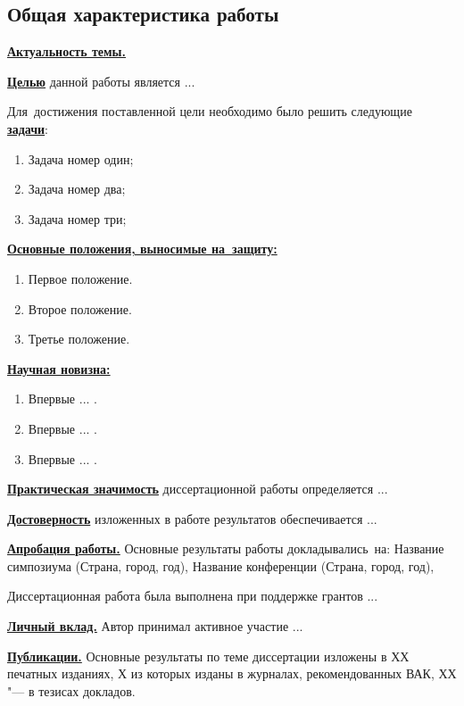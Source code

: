 \subsection*{\Large Общая характеристика работы}
\fontsize{14pt}{15pt}\selectfont
\underline{\textbf{Актуальность темы.}}

\underline{\textbf{Целью}} данной работы является ...

Для~достижения поставленной цели необходимо было решить следующие \underline{\textbf{задачи}}:
\begin{enumerate}
 \item Задача номер один;
 \item Задача номер два;
 \item Задача номер три;
\end{enumerate}

\underline{\textbf{Основные положения, выносимые на~защиту:}}
\begin{enumerate}
 \item Первое положение.
 \item Второе положение.
 \item Третье положение.
\end{enumerate}

\underline{\textbf{Научная новизна:}}
\begin{enumerate}
 \item Впервые ... . 
 \item Впервые ... .
 \item Впервые ... . 
\end{enumerate}

\underline{\textbf{Практическая значимость}} диссертационной работы определяется ...

\underline{\textbf{Достоверность}} изложенных в работе результатов обеспечивается ...

\underline{\textbf{Апробация работы.}}
Основные результаты работы докладывались~на:
Название симпозиума (Страна, город, год),
Название конференции (Страна, город, год),

Диссертационная работа была выполнена при поддержке грантов ...

\underline{\textbf{Личный вклад.}} Автор принимал активное участие ...

\underline{\textbf{Публикации.}} Основные результаты по теме диссертации изложены в ХХ печатных изданиях, Х из которых изданы в журналах, рекомендованных ВАК, ХХ "--- в тезисах докладов.

